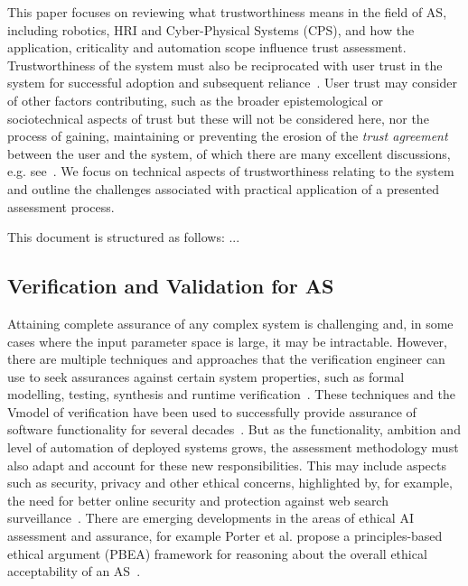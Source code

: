 This paper focuses on reviewing what trustworthiness means in the field of AS, including robotics, HRI and Cyber-Physical Systems (CPS), and how the application, criticality and automation scope influence trust assessment. 
%
Trustworthiness of the system must also be reciprocated with user trust in the system for successful adoption and subsequent reliance~\cite{Lee2004}. User trust may consider of other factors contributing, such as the broader epistemological or sociotechnical aspects of trust but these will not be considered here, nor the process of gaining, maintaining or preventing the erosion of the \emph{trust agreement} between the user and the system, of which there are many excellent discussions, e.g. see~\cite{Kohn2021,Lee2004,kok2020trust,Chiou2021,Floridi2018}. 
%
We focus on technical aspects of trustworthiness relating to the system and outline the challenges associated with practical application of a presented assessment process. 

This document is structured as follows: ...


\subsection{Verification and Validation for AS} \label{sec:intro-vav}

Attaining complete assurance of any complex system is challenging and, in some cases where the input parameter space is large, it may be intractable. 
%
However, there are multiple techniques and approaches that the verification engineer can use to seek assurances against certain system properties, such as formal modelling, testing, synthesis and runtime verification~\cite{kress2021formalizing}. 
%
These techniques and the V\-model of verification have been used to successfully provide assurance of software functionality for several decades~\cite{Fewster1999}. 
%
But as the functionality, ambition and level of automation of deployed systems grows, the assessment methodology must also adapt and account for these new responsibilities. This may include aspects such as security, privacy and other ethical concerns, highlighted by, for example, the need for better online security and protection against web search surveillance~\cite{trackmenot2009}. 
%
There are emerging developments in the areas of ethical AI assessment and assurance, for example Porter et al. propose a principles-based ethical argument (PBEA) framework for reasoning about the overall ethical acceptability of an AS~\cite{Porter2022}. 


